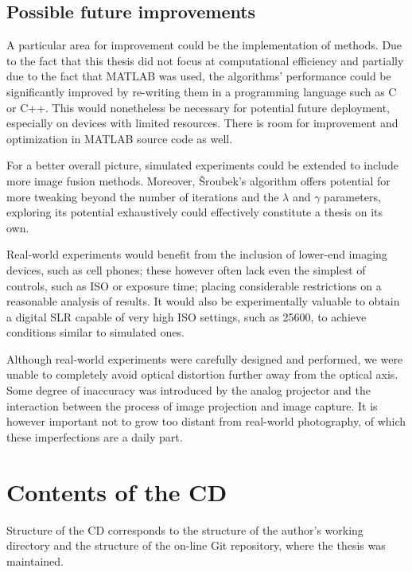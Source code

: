 \documentclass[12pt,notitlepage]{report}
\begin{document}
\section{Possible future improvements}

A particular area for improvement could be the implementation of methods. Due to the fact that this thesis did not focus at computational efficiency and partially due to the fact that MATLAB was used, the algorithms' performance could be significantly improved by re-writing them in a programming language such as C or C++. This would nonetheless be necessary for potential future deployment, especially on devices with limited resources. There is room for improvement and optimization in MATLAB source code as well. 

For a better overall picture, simulated experiments could be extended to include more image fusion methods. Moreover, Šroubek's algorithm offers potential for more tweaking beyond the number of iterations and the $\lambda$ and $\gamma$ parameters, exploring its potential exhaustively could effectively constitute a thesis on its own.

Real-world experiments would benefit from the inclusion of lower-end imaging devices, such as cell phones; these however often lack even the simplest of controls, such as ISO or exposure time; placing considerable restrictions on a reasonable analysis of results. It would also be experimentally valuable to obtain a digital SLR capable of very high ISO settings, such as 25600, to achieve conditions similar to simulated ones. 

Although real-world experiments were carefully designed and performed, we were unable to completely avoid optical distortion further away from the optical axis. Some degree of inaccuracy was introduced by the analog projector and the interaction between the process of image projection and image capture. It is however important not to grow too distant from real-world photography, of which these imperfections are a daily part. 

\appendix

\chapter{Contents of the CD}

Structure of the CD corresponds to the structure of the author's working directory and the structure of the on-line Git repository, where the thesis was maintained. 
\end{document}
